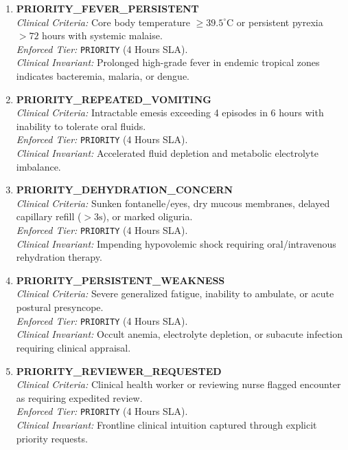 \documentclass[11pt,a4paper,oneside]{report}
\begin{document}
\begin{enumerate}[leftmargin=20pt, resume]
  \item \textbf{PRIORITY\_FEVER\_PERSISTENT}\\
  \textit{Clinical Criteria:} Core body temperature $\ge 39.5^\circ\text{C}$ or persistent pyrexia $> 72$ hours with systemic malaise.\\
  \textit{Enforced Tier:} \texttt{PRIORITY} (4 Hours SLA).\\
  \textit{Clinical Invariant:} Prolonged high-grade fever in endemic tropical zones indicates bacteremia, malaria, or dengue.

  \item \textbf{PRIORITY\_REPEATED\_VOMITING}\\
  \textit{Clinical Criteria:} Intractable emesis exceeding 4 episodes in 6 hours with inability to tolerate oral fluids.\\
  \textit{Enforced Tier:} \texttt{PRIORITY} (4 Hours SLA).\\
  \textit{Clinical Invariant:} Accelerated fluid depletion and metabolic electrolyte imbalance.

  \item \textbf{PRIORITY\_DEHYDRATION\_CONCERN}\\
  \textit{Clinical Criteria:} Sunken fontanelle/eyes, dry mucous membranes, delayed capillary refill ($> 3\text{s}$), or marked oliguria.\\
  \textit{Enforced Tier:} \texttt{PRIORITY} (4 Hours SLA).\\
  \textit{Clinical Invariant:} Impending hypovolemic shock requiring oral/intravenous rehydration therapy.

  \item \textbf{PRIORITY\_PERSISTENT\_WEAKNESS}\\
  \textit{Clinical Criteria:} Severe generalized fatigue, inability to ambulate, or acute postural presyncope.\\
  \textit{Enforced Tier:} \texttt{PRIORITY} (4 Hours SLA).\\
  \textit{Clinical Invariant:} Occult anemia, electrolyte depletion, or subacute infection requiring clinical appraisal.

  \item \textbf{PRIORITY\_REVIEWER\_REQUESTED}\\
  \textit{Clinical Criteria:} Clinical health worker or reviewing nurse flagged encounter as requiring expedited review.\\
  \textit{Enforced Tier:} \texttt{PRIORITY} (4 Hours SLA).\\
  \textit{Clinical Invariant:} Frontline clinical intuition captured through explicit priority requests.
\end{enumerate}
\end{document}
